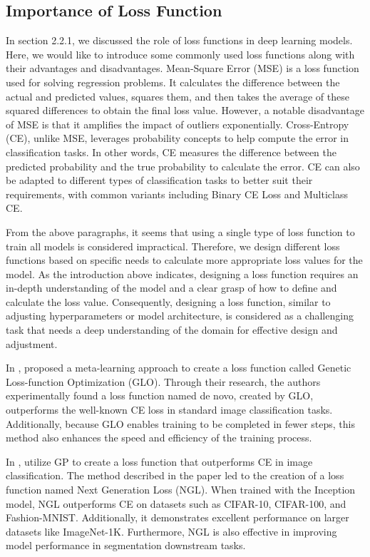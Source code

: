 \begin{ZhChapter}
    \subsection{Importance of Loss Function}
    In section 2.2.1, we discussed the role of loss functions in deep learning models. Here, we would like to introduce some commonly used loss functions along with their advantages and disadvantages. Mean-Square Error (MSE) is a loss function used for solving regression problems. It calculates the difference between the actual and predicted values, squares them, and then takes the average of these squared differences to obtain the final loss value. However, a notable disadvantage of MSE is that it amplifies the impact of outliers exponentially. Cross-Entropy (CE), unlike MSE, leverages probability concepts to help compute the error in classification tasks. In other words, CE measures the difference between the predicted probability and the true probability to calculate the error. CE can also be adapted to different types of classification tasks to better suit their requirements, with common variants including Binary CE Loss and Multiclass CE.

    From the above paragraphs, it seems that using a single type of loss function to train all models is considered impractical. Therefore, we design different loss functions based on specific needs to calculate more appropriate loss values for the model. As the introduction above indicates, designing a loss function requires an in-depth understanding of the model and a clear grasp of how to define and calculate the loss value. Consequently, designing a loss function, similar to adjusting hyperparameters or model architecture, is considered as a challenging task that needs a deep understanding of the domain for effective design and adjustment.

    In \cite{gonzalez2020improvedtrainingspeedaccuracy}, \citeauthor{gonzalez2020improvedtrainingspeedaccuracy} proposed a meta-learning approach to create a loss function called Genetic Loss-function Optimization (GLO). Through their research, the authors experimentally found a loss function named de novo, created by GLO, outperforms the well-known CE loss in standard image classification tasks. Additionally, because GLO enables training to be completed in fewer steps, this method also enhances the speed and efficiency of the training process.

    In \cite{akhmedova2024generationlossfunctionimage}, \citeauthor{akhmedova2024generationlossfunctionimage} utilize GP to create a loss function that outperforms CE in image classification. The method described in the paper led to the creation of a loss function named Next Generation Loss (NGL). When trained with the Inception model, NGL outperforms CE on datasets such as CIFAR-10, CIFAR-100, and Fashion-MNIST. Additionally, it demonstrates excellent performance on larger datasets like ImageNet-1K. Furthermore, NGL is also effective in improving model performance in segmentation downstream tasks.


\end{ZhChapter}
